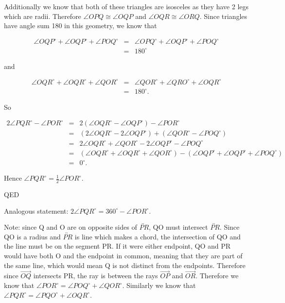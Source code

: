 \documentclass[12pt,letterpaper]{article}
\newcommand{\Proof}{\noindent {\bf Proof: }}
\newcommand{\QED}{\begin{flushright}QED\end{flushright}}
\begin{document}
Additionally we know that both of these triangles are isosceles as they have 2 legs which are radii. Therefore $\angle OPQ \cong \angle OQP$ and $\angle OQR \cong \angle ORQ$.  Since triangles have angle sum 180 in this geometry, we know that 

\begin{eqnarray*}
\angle OQP^\circ + \angle OQP^\circ + \angle POQ^\circ &=& \angle OPQ^\circ + \angle OQP^\circ + \angle POQ^\circ \\
&=& 180^\circ
\end{eqnarray*}

and 

\begin{eqnarray*}
\angle OQR^\circ + \angle OQR^\circ + \angle QOR^\circ &=& \angle QOR^\circ + \angle QRO^\circ + \angle OQR^\circ \\
&=& 180^\circ.
\end{eqnarray*}
 
   So 
   
\begin{eqnarray*}
2\angle PQR^\circ - \angle POR^\circ &=& 2(\angle OQR^\circ  -\angle OQP^\circ) - \angle POR^\circ \\
&=& (2\angle OQR^\circ  -2\angle OQP^\circ) + (\angle QOR^\circ - \angle POQ^\circ)\\
 &=& 2\angle OQR^\circ + \angle QOR^\circ -2\angle OQP^\circ - \angle POQ^\circ\\
&=& (\angle OQR^\circ + \angle OQR^\circ + \angle QOR^\circ) -(\angle OQP^\circ + \angle OQP^\circ + \angle POQ^\circ)\\
&=& 0^\circ.
\end{eqnarray*}  
   
Hence $\angle PQR^\circ = \frac{1}{2} \angle POR^\circ$.


\QED

\newpage 

Analogous statement:  $2\angle PQR^\circ = 360^\circ - \angle POR^\circ$.

\Proof

Note:  since Q and O are on opposite sides of $\overleftrightarrow{PR}$, QO must intersect $\overleftrightarrow{PR}$.  Since QO is a radius and $\overleftrightarrow{PR}$ is line which makes a chord, the intersection of QO and the line must be on the segment PR. If it were either endpoint, QO and PR would have both O and the endpoint in common, meaning that they are part of the same line, which would mean Q is not distinct from the endpoints.   Therefore since $\overrightarrow{OQ}$ intersects PR, the ray is between the rays $\overrightarrow{OP}$ and $\overrightarrow{OR}$. Therefore we know that $\angle POR^\circ = \angle POQ^\circ + \angle QOR^\circ$. Similarly we know that $\angle PQR^\circ = \angle PQO^\circ + \angle OQR^\circ$. 
\end{document}
